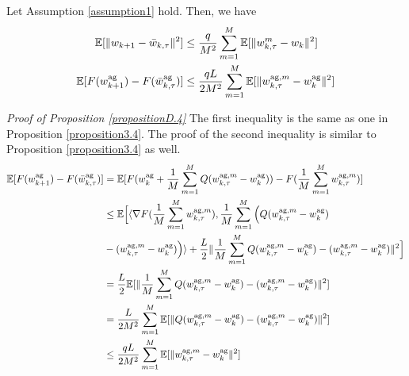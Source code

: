 \documentclass[11pt]{article}
\begin{document}
\begin{proposition} \label{propositionD.4}
Let Assumption \ref{assumption1} hold. Then, we have
\begin{align*}
    \mathbb{E}[\|w_{k+1} - \Bar{w}_{k, \tau}\|^2] &\leq \frac{q}{M^2}\sum_{m=1}^M \mathbb{E}[\|w_{k, \tau}^m - w_k\|^2] \\
    \mathbb{E}[F(w_{k+1}^{\textrm{ag}}) - F(\Bar{w}_{k, \tau}^{\textrm{ag}})] &\leq \frac{qL}{2M^2} \sum_{m=1}^M \mathbb{E}[\|w_{k, \tau}^{\textrm{ag}, m} - w_k^{\textrm{ag}}\|^2]
\end{align*}
\end{proposition}

\emph{Proof of Proposition \ref{propositionD.4}} \textrm{ } The first inequality is the same as one in Proposition \ref{proposition3.4}.
The proof of the second inequality is similar to Proposition \ref{proposition3.4} as well.
\begin{align*}
    \mathbb{E}[F(w_{k+1}^{\textrm{ag}}) - F(\Bar{w}_{k, \tau}^{\textrm{ag}})] &= \mathbb{E}[F(w_k^{\textrm{ag}} + \frac{1}{M}\sum_{m=1}^M Q(w_{k, \tau}^{\textrm{ag}, m} - w_k^{\textrm{ag}})) - F(\frac{1}{M}\sum_{m=1}^M w_{k, \tau}^{\textrm{ag}, m})] \\
    &\leq \mathbb{E}\Big[ \langle \nabla F(\frac{1}{M} \sum_{m=1}^M w_{k, \tau}^{\textrm{ag}, m}), \frac{1}{M} \sum_{m=1}^M \Big( Q(w_{k, \tau}^{\textrm{ag}, m} - w_k^{\textrm{ag}}) \\
    &- (w_{k, \tau}^{\textrm{ag}, m} - w_k^{\textrm{ag}})\Big) \rangle + \frac{L}{2} \|\frac{1}{M} \sum_{m=1}^M  Q(w_{k, \tau}^{\textrm{ag}, m} - w_k^{\textrm{ag}}) - (w_{k, \tau}^{\textrm{ag}, m} - w_k^{\textrm{ag}})\|^2\Big] \\
    &= \frac{L}{2} \mathbb{E}[\|\frac{1}{M} \sum_{m=1}^M  Q(w_{k, \tau}^{\textrm{ag}, m} - w_k^{\textrm{ag}}) - (w_{k, \tau}^{\textrm{ag}, m} - w_k^{\textrm{ag}})\|^2] \\
    &= \frac{L}{2M^2}\sum_{m=1}^M \mathbb{E}[\| Q(w_{k, \tau}^{\textrm{ag}, m} - w_k^{\textrm{ag}}) - (w_{k, \tau}^{\textrm{ag}, m} - w_k^{\textrm{ag}})\|^2] \\
    &\leq \frac{qL}{2M^2} \sum_{m=1}^M \mathbb{E}[\|w_{k, \tau}^{\textrm{ag}, m} - w_k^{\textrm{ag}}\|^2]
\end{align*}
\end{document}

